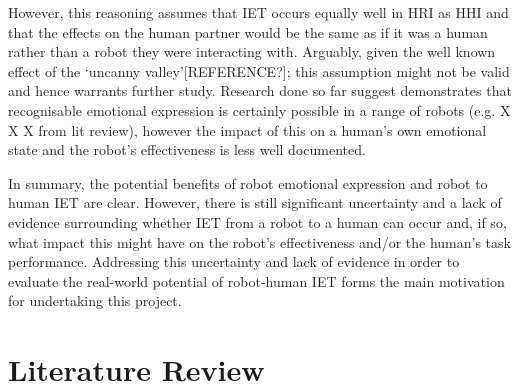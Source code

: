 \documentclass[11pt]{article}
\begin{document}
However, this reasoning assumes that IET occurs equally well in HRI as HHI and that the effects on the human partner would be the same as if it was a human rather than a robot they were interacting with. Arguably, given the well known effect of the `uncanny valley'[REFERENCE?]; this assumption might not be valid and hence warrants further study. Research done so far suggest demonstrates that recognisable emotional expression is certainly possible in a range of robots (e.g. X X X from lit review), however the impact of this on a human's own emotional state and the robot's effectiveness is less well documented. 

In summary, the potential benefits of robot emotional expression and robot to human IET are clear. However, there is still significant uncertainty and a lack of evidence surrounding whether IET from a robot to a human can occur  and, if so, what impact this might have on the robot's effectiveness and/or the human's task performance. Addressing this uncertainty and lack of evidence in order to evaluate the real-world potential of robot-human IET forms the main motivation for undertaking this project. 

\section{Literature Review}
\end{document}
